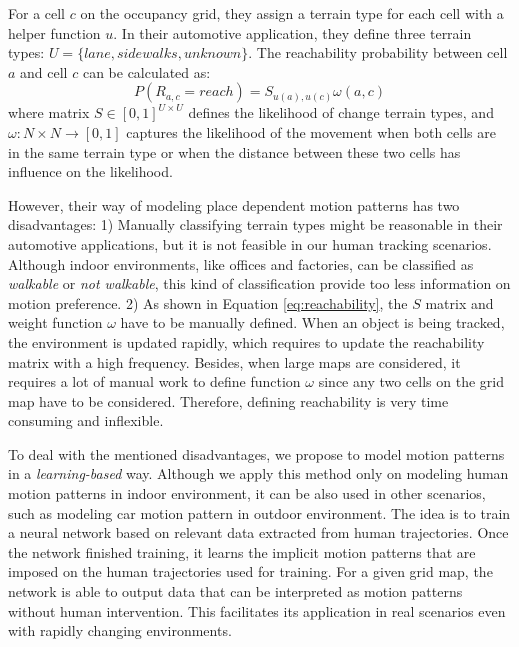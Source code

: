 For a cell $c$ on the occupancy grid, they assign a terrain type for each cell with a helper function $u$. In their automotive application, they define three terrain types: $U=\{lane, sidewalks, unknown\}$. The reachability probability between cell $a$ and cell $c$ can be calculated as:
\begin{equation}
P(R_{a,c}=reach) = S_{u(a), u(c)} \omega(a, c) \label{eq:reachability}
\end{equation}
where matrix $S\in[0,1]^{U\times U}$ defines the likelihood of change terrain types, and $\omega: N \times N \rightarrow [0,1]$ captures the likelihood of the movement when both cells are in the same terrain type or when the distance between these two cells has influence on the likelihood.

However, their way of modeling place dependent motion patterns has two disadvantages: 1) Manually classifying terrain types might be reasonable in their automotive applications, but it is not feasible in our human tracking scenarios. Although indoor environments, like offices and factories, can be classified as \textit{walkable} or \textit{not walkable}, this kind of classification provide too less information on motion preference. 2) As shown in Equation \ref{eq:reachability}, the $S$ matrix and weight function $\omega$ have to be manually defined. When an object is being tracked, the environment is updated rapidly, which requires to update the reachability matrix with a high frequency. Besides, when large maps are considered, it requires a lot of manual work to define function $\omega$ since any two cells on the grid map have to be considered. Therefore, defining reachability is very time consuming and inflexible. 

To deal with the mentioned disadvantages, we propose to model motion patterns in a \textit{learning-based} way. Although we apply this method only on modeling human motion patterns in indoor environment, it can be also used in other scenarios, such as modeling car motion pattern in outdoor environment. The idea is to train a neural network based on relevant data extracted from human trajectories. Once the network finished training, it learns the implicit motion patterns that are imposed on the human trajectories used for training. For a given grid map, the network is able to output data that can be interpreted as motion patterns without human intervention. This facilitates its application in real scenarios even with rapidly changing environments.   

